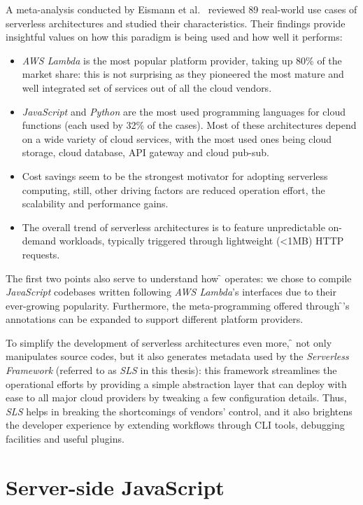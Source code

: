 A meta-analysis conducted by Eismann et al.~\cite{meta-analysis} reviewed
89 real-world use cases of serverless architectures and studied their characteristics.
Their findings provide insightful values on how this
paradigm is being used and how well it performs:
\begin{itemize}
  \item \textit{AWS Lambda} is the most popular platform provider, taking up 80\% of the market share:
    this is not surprising as they pioneered the most mature and well integrated set of services out of all
    the cloud vendors.
  \item \textit{JavaScript} and \textit{Python} are the most used
    programming languages for cloud functions (each used by 32\% of the cases).
    Most of these architectures depend on a wide variety of cloud services, with the most used
    ones being cloud storage, cloud database, API gateway and cloud pub-sub.
  \item Cost savings seem to be the strongest motivator for adopting serverless computing,
    still, other driving factors are reduced operation effort, the scalability and performance gains.
  \item The overall trend of serverless architectures is to feature unpredictable on-demand
  workloads, typically triggered through lightweight (<1MB) HTTP requests.
\end{itemize}

The first two points also serve to understand how \f{} operates:
we chose to compile \textit{JavaScript} codebases written following
\textit{AWS Lambda}'s interfaces due to their ever-growing popularity.
Furthermore, the meta-programming offered through \f{}'s annotations
can be expanded to support different platform providers.

To simplify the development of serverless architectures even more,
\f{} not only manipulates source codes, but it also generates metadata used
by the \textit{Serverless Framework} \cite{sls} (referred to as \textit{SLS} in this thesis):
this framework streamlines the operational efforts by providing a simple abstraction layer
that can deploy with ease to all major cloud providers by tweaking a few configuration details.
Thus, \textit{SLS} helps in breaking the shortcomings of vendors' control, and it also brightens
the developer experience by extending workflows through CLI tools, debugging facilities and useful plugins.

\section{Server-side JavaScript}
\label{sec:node}

